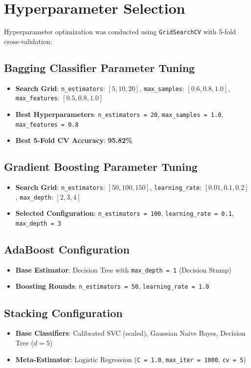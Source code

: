 \documentclass[12pt,a4paper]{article}
\begin{document}
\section{Hyperparameter Selection}

Hyperparameter optimization was conducted using \texttt{GridSearchCV} with 5-fold cross-validation:

\subsection*{Bagging Classifier Parameter Tuning}
\begin{itemize}
\item \textbf{Search Grid}: \texttt{n\_estimators}: $[5, 10, 20]$, \texttt{max\_samples}: $[0.6, 0.8, 1.0]$, \texttt{max\_features}: $[0.5, 0.8, 1.0]$
\item \textbf{Best Hyperparameters}: \texttt{n\_estimators = 20}, \texttt{max\_samples = 1.0}, \texttt{max\_features = 0.8}
\item \textbf{Best 5-Fold CV Accuracy}: \textbf{95.82\%}
\end{itemize}

\subsection*{Gradient Boosting Parameter Tuning}
\begin{itemize}
\item \textbf{Search Grid}: \texttt{n\_estimators}: $[50, 100, 150]$, \texttt{learning\_rate}: $[0.01, 0.1, 0.2]$, \texttt{max\_depth}: $[2, 3, 4]$
\item \textbf{Selected Configuration}: \texttt{n\_estimators = 100}, \texttt{learning\_rate = 0.1}, \texttt{max\_depth = 3}
\end{itemize}

\subsection*{AdaBoost Configuration}
\begin{itemize}
\item \textbf{Base Estimator}: Decision Tree with \texttt{max\_depth = 1} (Decision Stump)
\item \textbf{Boosting Rounds}: \texttt{n\_estimators = 50}, \texttt{learning\_rate = 1.0}
\end{itemize}

\subsection*{Stacking Configuration}
\begin{itemize}
\item \textbf{Base Classifiers}: Calibrated SVC (scaled), Gaussian Naive Bayes, Decision Tree ($d=5$)
\item \textbf{Meta-Estimator}: Logistic Regression (\texttt{C = 1.0}, \texttt{max\_iter = 1000}, \texttt{cv = 5})
\end{itemize}
\end{document}
